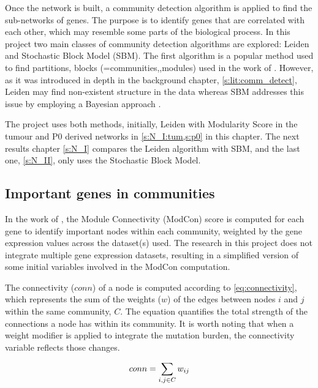 Once the network is built, a community detection algorithm is applied to find the sub-networks of genes. The purpose is to identify genes that are correlated with each other, which may resemble some parts of the biological process. In this project two main classes of community detection algorithms are explored: Leiden and Stochastic Block Model (SBM). The first algorithm is a popular method used to find partitions, blocks (=communities,,modules) used in the work of \citet{Care2019-ij}. However, as it was introduced in depth in the background chapter, \cref{s:lit:comm_detect}, Leiden may find non-existent structure in the data \citep{Peixoto2023-se} whereas SBM addresses this issue by employing a Bayesian approach \citep{Peixoto2019-fg}. 

The project uses both methods, initially, Leiden with Modularity Score in the tumour and P0 derived networks in \cref{s:N_I:tum,s:p0} in this chapter. The next results chapter \cref{s:N_I} compares the Leiden algorithm with SBM, and the last one, \cref{s:N_II}, only uses the Stochastic Block Model.


\subsection{Important genes in communities} \label{s:N_I:methods_modcon}

In the work of \citet{Care2019-ij}, the Module Connectivity (ModCon) score is computed for each gene to identify important nodes within each community, weighted by the gene expression values across the dataset(s) used. The research in this project does not integrate multiple gene expression datasets, resulting in a simplified version of some initial variables involved in the ModCon computation.

The connectivity ($conn$) of a node is computed according to \cref{eq:connectivity}, which represents the sum of the weights ($w$) of the edges between nodes $i$ and $j$ within the same community, $C$. The equation quantifies the total strength of the connections a node has within its community. It is worth noting that when a weight modifier is applied to integrate the mutation burden, the connectivity variable reflects those changes.

\begin{equation} \label{eq:connectivity}
    conn = \sum_{\substack{i, j \in C}} w_{ij} \\
\end{equation}

